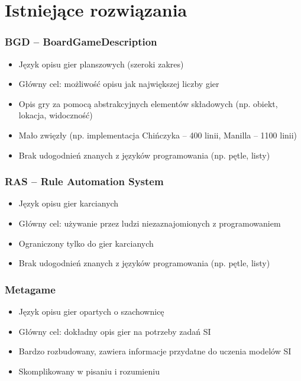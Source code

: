 \documentclass{beamer}
\begin{document}
\section{Istniejące rozwiązania}

\begin{frame}
	\frametitle{BGD -- BoardGameDescription\cite{BGD}}
	\begin{itemize}
		\item Język opisu gier planszowych (szeroki zakres)
		\item Główny cel: możliwość opisu jak największej liczby gier
		\item Opis gry za pomocą abstrakcyjnych elementów składowych (np. obiekt, lokacja, widoczność)
		\item Mało zwięzły (np. implementacja Chińczyka -- 400 linii, Manilla -- 1100 linii)
		\item Brak udogodnień znanych z języków programowania (np. pętle, listy)
	\end{itemize}
\end{frame}

\begin{frame}
	\frametitle{RAS -- Rule Automation System\cite{RAS}}
	\begin{itemize}
		\item Język opisu gier karcianych
		\item Główny cel: używanie przez ludzi niezaznajomionych z programowaniem
		\item Ograniczony tylko do gier karcianych
		\item Brak udogodnień znanych z języków programowania (np. pętle, listy)
	\end{itemize}
\end{frame}

\begin{frame}
	\frametitle{Metagame\cite{metagame}}
	\begin{itemize}
		\item Język opisu gier opartych o szachownicę
		\item Główny cel: dokładny opis gier na potrzeby zadań SI
		\item Bardzo rozbudowany, zawiera informacje przydatne do uczenia modelów SI
		\item Skomplikowany w pisaniu i rozumieniu
	\end{itemize}
\end{frame}
\end{document}
